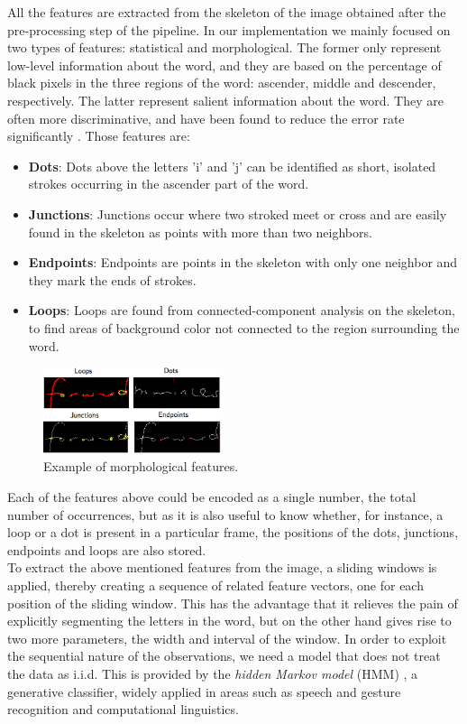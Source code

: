 \documentclass[conference]{IEEEtran}
\begin{document}
All the features are extracted from the skeleton of the image obtained after the pre-processing step of the pipeline. In our implementation we mainly focused on two types of features: statistical and morphological. The former only represent low-level information about the word, and they are based on the percentage of black pixels in the three regions of the word: ascender, middle and descender, respectively. The latter represent salient information about the word. They are often more discriminative, and have been found to reduce the error rate significantly \cite{10.1109/34.667887}. Those features are:
\begin{itemize}
\item {\bf Dots}: Dots above the letters 'i' and 'j' can be identified as short, isolated strokes occurring in the ascender part of the word.
\item {\bf Junctions}: Junctions occur where two stroked meet or cross and are easily found in the skeleton as points with more than two neighbors.
\item {\bf Endpoints}: Endpoints are points in the skeleton with only one neighbor and they mark the ends of strokes. 
\item {\bf Loops}: Loops are found from connected-component analysis on the skeleton, to find areas of background color not connected to the region surrounding the word. 
\end{itemize}

\begin{figure}
 \centering
\includegraphics[width=0.47\textwidth]{features2.png}
\caption{Example of morphological features.}
\label{fig:pipeline}
\end{figure}
Each of the features above could be encoded as a single number, the total number of occurrences, but as it is also useful to know whether, for instance, a loop or a dot is present in a particular frame, the positions of the dots, junctions, endpoints and loops are also stored. \\

To extract the above mentioned features from the image, a sliding windows is applied, thereby creating a sequence of related feature vectors, one for each position of the sliding window. This has the advantage that it relieves the pain of explicitly segmenting the letters in the word, but on the other hand gives rise to two more parameters, the width and interval of the window. In order to exploit the sequential nature of the observations, we need a model that does not treat the data as i.i.d. This is provided by the {\it hidden Markov model} (HMM) \cite{rabiner-89,Rabiner86Z27}, a generative classifier, widely applied in areas such as speech and gesture recognition and computational linguistics.
\end{document}
